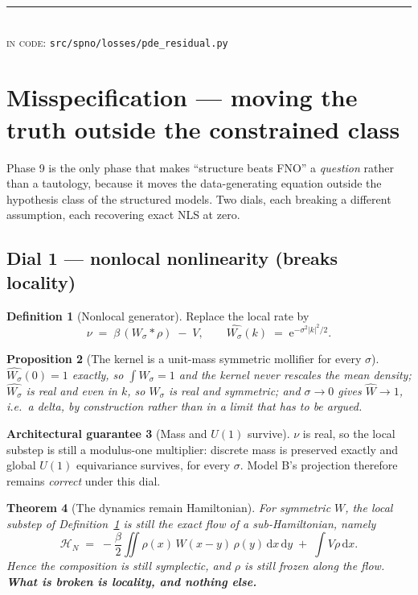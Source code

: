 \documentclass[11pt,a4paper]{article}
\theoremstyle{plain}
\newtheorem{theorem}{Theorem}[section]
\newtheorem{proposition}[theorem]{Proposition}
\theoremstyle{definition}
\newtheorem{definition}[theorem]{Definition}
\newtheorem{guarantee}[theorem]{Architectural guarantee}
\theoremstyle{remark}
\newcommand{\eu}{\mathrm{e}}
\newcommand{\dd}{\,\mathrm{d}}
\newcommand{\Ham}{\mathcal{H}}
\newcommand{\src}[1]{{\color{linknavy}\texttt{\footnotesize #1}}}
\newcommand{\sourcenote}[1]{%
  \par\vspace{0.35em}\noindent
  {\footnotesize\color{rulegray}\rule{\linewidth}{0.4pt}\\[0.25em]
  \textsc{in code:} \src{#1}}\par\vspace{0.5em}}
\begin{document}
\sourcenote{src/spno/losses/pde\_residual.py}

\section{Misspecification --- moving the truth outside the constrained class}
\label{sec:misspec}

Phase 9 is the only phase that makes ``structure beats FNO'' a \emph{question} rather than
a tautology, because it moves the data-generating equation outside the hypothesis class of
the structured models. Two dials, each breaking a different assumption, each recovering
exact NLS at zero.

\subsection{Dial 1 --- nonlocal nonlinearity (breaks locality)}

\begin{definition}[Nonlocal generator]
\label{def:nonlocal}
Replace the local rate by
\[
\nu \;=\; \beta\,(W_\sigma * \rho) \;-\; V,
\qquad
\widehat{W_\sigma}(k) \;=\; \eu^{-\sigma^2|k|^2/2}.
\]
\end{definition}

\begin{proposition}[The kernel is a unit-mass symmetric mollifier for every $\sigma$]
\label{prop:kernel}
$\widehat{W_\sigma}(0) = 1$ exactly, so $\int W_\sigma = 1$ and the kernel never rescales
the mean density; $\widehat{W_\sigma}$ is real and even in $k$, so $W_\sigma$ is real and
symmetric; and $\sigma\to0$ gives $\widehat{W}\to1$, i.e.\ a delta, \emph{by construction}
rather than in a limit that has to be argued.
\end{proposition}

\begin{guarantee}[Mass and $U(1)$ survive]
$\nu$ is real, so the local substep is still a modulus-one multiplier: discrete mass is
preserved exactly and global $U(1)$ equivariance survives, for every $\sigma$. Model B's
projection therefore remains \emph{correct} under this dial.
\end{guarantee}

\begin{theorem}[The dynamics remain Hamiltonian]
\label{thm:nonlocalham}
For symmetric $W$, the local substep of Definition~\ref{def:nonlocal} is still the exact
flow of a sub-Hamiltonian, namely
\[
\Ham_N \;=\; -\frac{\beta}{2}\iint \rho(x)\,W(x-y)\,\rho(y)\dd x\dd y \;+\; \int V\rho\dd x .
\]
Hence the composition is still symplectic, and $\rho$ is still frozen along the flow.
\textbf{What is broken is locality, and nothing else.}
\end{theorem}
\end{document}
